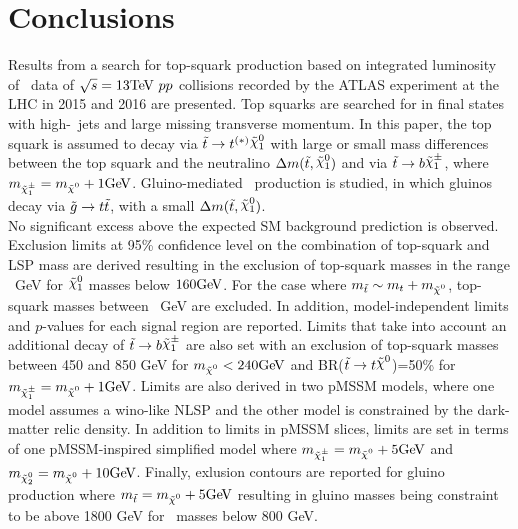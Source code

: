\chapter{Conclusions}
\label{ch:conclusion}


Results from a search for top-squark production based
on integrated luminosity of \lumi\ data of $\rts = 13 \tev ~pp$ 
collisions recorded by the ATLAS experiment at the LHC in 2015 and
2016 are presented. Top squarks are searched for in
final states with high-\pT\ jets and large missing transverse
momentum. In this paper, the top squark is assumed to decay via $\stop
\rightarrow t^{(*)} \ninoone$ with large or small mass differences between the top squark and the neutralino $\Delta
m(\stop,\ninoone)$ and via $\stop\to b \chinoonepm$, where $m_{\chinoonepm}=\mLSP+1\gev$. 
Gluino-mediated \stop\ production is
studied, in which gluinos decay via $\tilde{g}\rightarrow t\tilde{t}$, with a
small $\Delta m(\stop,\ninoone)$. \\

No significant excess above the expected SM background prediction is observed. Exclusion limits at 95\% confidence level on the combination of top-squark and LSP mass are derived resulting in the exclusion of top-squark masses in the range
\stopLimLowLSP\ GeV for $\ninoone$ masses below $160\GeV$. For the case where $\mstop\sim m_t+\mLSP$, top-squark masses between \stopLimDiag\ GeV are excluded. In addition, model-independent limits and $p$-values for each signal region are reported. Limits that take into account an additional decay of $\stop\to b \chinoonepm$ are also set with an exclusion of top-squark masses between 450 and 850 GeV for $\mLSP<240\gev$ and BR($\stop\to t \LSP$)=50\% for $m_{\chinoonepm}=\mLSP+1\gev$. Limits are also derived in two pMSSM models, where one model assumes a wino-like NLSP and the other model is constrained by the dark-matter relic density. In addition to limits in pMSSM slices, limits are set in terms of one pMSSM-inspired simplified model where $m_{\chinoonepm}=\mLSP+5\gev$ and $m_{\ninotwo}=\mLSP+10\gev$. Finally, exlusion contours are reported for gluino production where $\mstop=\mLSP+5\gev$ resulting in gluino masses being constraint to be above 1800 GeV for \stop\ masses below 800 GeV. \\
